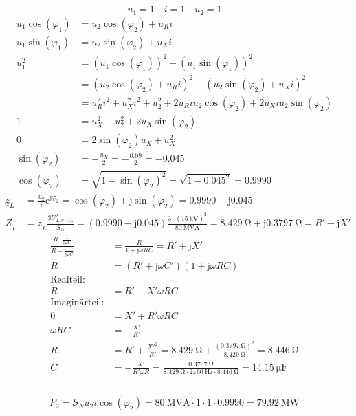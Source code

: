 \documentclass[11pt,a4paper]{scrartcl}
\newcommand{\mybr}[1]{\left(#1\right)}
\renewcommand{\j}{\mathrm{j}}
\newcommand{\Z}{\underline{Z}}
\newcommand{\z}{\underline{z}}
\newcommand{\0}{_{\mybr{0}}}
\newcommand{\1}{_{\mybr{1}}}
\newcommand{\2}{_{\mybr{2}}}
\newcommand{\USNA}{U_{2,N,AL}}
\newcommand{\ce}{\cos\mybr{\varphi_1}}
\newcommand{\se}{\sin\mybr{\varphi_1}}
\newcommand{\cz}{\cos\mybr{\varphi_2}}
\newcommand{\sz}{\sin\mybr{\varphi_2}}
\renewcommand{\e}{\mathrm{e}}
\begin{document}
\subsection{}
\begin{equation}
u_1=1\quad i=1\quad u_2=1
\end{equation}
\begin{align}
u_1\ce&=u_2\cz+u_R i\\
u_1\se&=u_2\sz+u_X i\\
u_1^2&=\mybr{u_1\ce}^2+\mybr{u_1\se}^2\\
&=\mybr{u_2\cz+u_R i}^2+\mybr{u_2\sz+u_X i}^2\\
&=u_R^2i^2+u_X^2i^2+u_2^2+2u_R i u_2 \cz+2u_X i u_2\sz\\
1&=u_X^2+u_2^2+2u_X\sz\\
0&=2\sz u_X+u_X^2\\
\sz&=-\frac{u_X}{2}=-\frac{\num{0.09}}{2}=\num{-0.045}\\
\cz&=\sqrt{1-\sz^2}=\sqrt{1-\num{0.045}^2}=\num{0.9990}
\end{align}
\begin{align}
\z_L&=\frac{u_2}{i}\e^{\j\varphi_2}=\cz+\j\sz=\num{0.9990}-\j\num{0.045}\\
\Z_L&=\z_L\frac{3\USNA^2}{S_N}=\mybr{\num{0.9990}-\j\num{0.045}}\frac{3\cdot\mybr{\SI{15}{\kilo\volt}}^2}{\SI{80}{\mega\volt\ampere}}=\SI{8.429}{\ohm}+\j\SI{0.3797}{\ohm}=R'+\j X'
\end{align}
\begin{align}
\frac{R\cdot\frac{1}{\j\omega C}}{R+\frac{1}{\j\omega C}}&=\frac{R}{1+\j\omega R C}=R'+\j X'\\
R&=\mybr{R'+\j\omega C'}\mybr{1+\j\omega R C}\\
\text{Realteil:}\\
R&=R'-X'\omega R C\\
\text{Imaginärteil:}\\
0&=X'+R'\omega R C\\
\omega R C &= -\frac{X'}{R'}\\
R &= R' + \frac{X'^2}{R'}=\SI{8.429}{\ohm} + \frac{\mybr{\SI{0.3797}{\ohm}}^2}{\SI{8.429}{\ohm}}=\SI{8.446}{\ohm}\\
C &= -\frac{X'}{R'\omega R}=\frac{\SI{0.3797}{\ohm}}{\SI{8.429}{\ohm}\cdot2\pi\SI{60}{\hertz}\cdot\SI{8.446}{\ohm}}=\SI{14.15}{\micro\farad}
\end{align}

\subsection{}
\begin{equation}
P_2=S_N u_2 i \cz=\SI{80}{\mega\volt\ampere}\cdot\num{1}\cdot\num{1}\cdot\num{0.9990}=\SI{79.92}{\mega\watt}
\end{equation}
\end{document}
